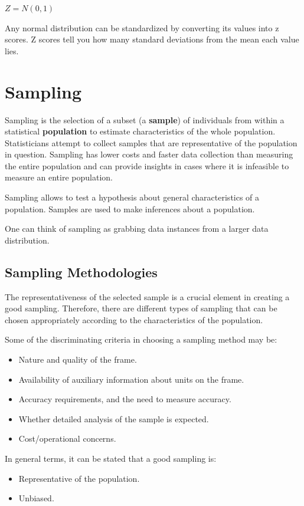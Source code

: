 \documentclass{article}
\begin{document}
$Z = N(0,1)$

Any normal distribution can be standardized by converting its values into z scores. Z scores tell you how many standard deviations from the mean each value lies.

\clearpage

\section{Sampling}
Sampling is the selection of a subset (a \textbf{sample}) of individuals from within a statistical \textbf{population} to estimate characteristics of the whole population. Statisticians attempt to collect samples that are representative of the population in question. Sampling has lower costs and faster data collection than measuring the entire population and can provide insights in cases where it is infeasible to measure an entire population.

Sampling allows to test a hypothesis about general characteristics of a population.
Samples are used to make inferences about a population. 

One can think of sampling as grabbing data instances from a larger data distribution. 

\subsection{Sampling Methodologies}
The representativeness of the selected sample is a crucial element in creating a good sampling. Therefore, there are different types of sampling that can be chosen appropriately according to the characteristics of the population.

Some of the discriminating criteria in choosing a sampling method may be:
\begin{itemize}
    \item Nature and quality of the frame.
    \item Availability of auxiliary information about units on the frame.
    \item Accuracy requirements, and the need to measure accuracy.
    \item Whether detailed analysis of the sample is expected.
    \item Cost/operational concerns.
\end{itemize}

In general terms, it can be stated that a good sampling is:
\begin{itemize}
    \item Representative of the population.
    \item Unbiased. 
\end{itemize}
 
\end{document}
